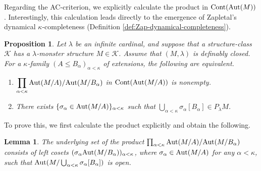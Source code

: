\documentclass[10pt]{amsart}
\numberwithin{equation}{section}
\theoremstyle{plain}
\newtheorem{lemma}[theorem]{Lemma}
\newtheorem{prop}[theorem]{Proposition}
\theoremstyle{definition}
\newcommand{\K}{\mathcal{K}}
\begin{document}
Regarding the AC-criterion, we explicitly calculate the product in ${\rm Cont}({\rm Aut}(M))$.
Interestingly, this calculation leads directly to the emergence of Zapletal's dynamical $\kappa$-completeness (Definition \ref{def:Zap-dynamical-completeness}).

\begin{prop}\label{prop:AC-critetion-contG-Zap}
Let $\lambda$ be an infinite cardinal, and suppose that a structure-class $\K$ has a $\lambda$-monster structure $M\in\K$.
Assume that $(M,\lambda)$ is definably closed.
For a $\kappa$-family $(A\leq B_\alpha)_{\alpha<\kappa}$ of extensions, the following are equivalent.
\begin{enumerate}
\item $\displaystyle{\prod_{\alpha<\kappa}{\rm Aut}(M/A)/{\rm Aut}(M/B_\alpha)}$ in ${\rm Cont}({\rm Aut}(M/A))$ is nonempty.
\item There exists $\{\sigma_\alpha\in {\rm Aut}(M/A)\}_{\alpha<\kappa}$ such that $\bigcup_{\alpha<\kappa}\sigma_\alpha[B_\alpha]\in P_\lambda M$.
\end{enumerate}
\end{prop}

To prove this, we first calculate the product explicitly and obtain the following.

\begin{lemma}\label{lem:product-calculation-cont}
The underlying set of the product $\prod_{\alpha<\kappa}{\rm Aut}(M/A)/{\rm Aut}(M/B_\alpha)$ consists of left cosets $(\sigma_\alpha{\rm Aut}(M/B_\alpha))_{\alpha<\kappa}$, where $\sigma_\alpha\in {\rm Aut}(M/A)$ for any $\alpha<\kappa$, such that ${\rm Aut}(M/\bigcup_{\alpha<\kappa}\sigma_\alpha[B_\alpha])$ is open.
\end{lemma}
\end{document}
